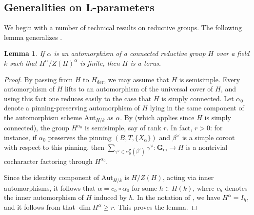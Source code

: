 \documentclass[reqno]{amsart}
\numberwithin{equation}{subsection}
\newcommand{\G}{\mathbf{G}}
\newcommand{\Z}{\mathbf{Z}}
\newcommand{\ol}[1]{\overline{#1}}
\DeclareMathOperator{\red}{red}
\DeclareMathOperator{\der}{der}
\newtheorem{lemma}[thm]{Lemma}
\theoremstyle{remark}
\numberwithin{equation}{subsection}
\numberwithin{figure}{subsection}
\begin{document}
\subsection{Generalities on L-parameters}\label{ss:generalities-1}

We begin with a number of technical results on reductive groups. The following lemma generalizes \cite[Lemme 1.10]{DM94}.

\begin{lemma}\label{lemma:finite-fixed-points}
If $\alpha$ is an automorphism of a connected reductive group $H$ over a field $k$ such that $H^\alpha/Z(H)^\alpha$ is finite, then $H$ is a torus. 
\end{lemma}

\begin{proof}
By passing from $H$ to $H_{\mathrm{der}}$, we may assume that $H$ is semisimple. Every automorphism of $H$ lifts to an automorphism of the universal cover of $H$, and using this fact one reduces easily to the case that $H$ is simply connected. Let $\alpha_0$ denote a pinning-preserving automorphism of $H$ lying in the same component of the automorphism scheme $\mathrm{Aut}_{H/k}$ as $\alpha$. By \cite[Proposition 1]{Spr06} (which applies since $H$ is simply connected), the group $H^{\alpha_0}$ is semisimple, say of rank $r$. In fact, $r > 0$: for instance, if $\alpha_0$ preserves the pinning $(B, T, \{X_\alpha\})$ and $\beta^\vee$ is a simple coroot with respect to this pinning, then $\sum_{\gamma^\vee \in \alpha_0^{\Z}(\beta^\vee)} \gamma^\vee\colon \G_{\mathrm{m}} \to H$ is a nontrivial cocharacter factoring through $H^{\alpha_0}$.

Since the identity component of $\mathrm{Aut}_{H/k}$ is $H/Z(H)$, acting via inner automorphisms, it follows that $\alpha = c_h \circ \alpha_0$ for some $h \in H(k)$, where $c_h$ denotes the inner automorphism of $H$ induced by $h$. In the notation of \cite[\S 5.2]{XZ19}, we have $H^\alpha = I_h$, and it follows from \cite[Remark 5.2.2(1)]{XZ19} that $\dim H^\alpha \geq r$. This proves the lemma.
\end{proof}


\end{document}
